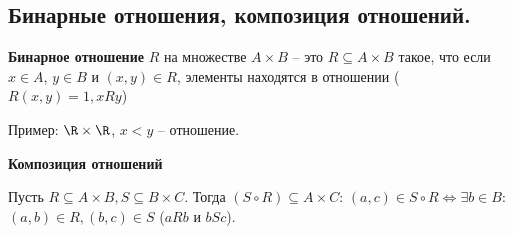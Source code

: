 \subsection{Бинарные отношения, композиция отношений.}

 \textbf{Бинарное отношение} $R$ на множестве $A \times B$ -- это $R \subseteq A \times B$ такое, что если $x \in A$, $y \in B$ и $(x, y) \in R$, элементы находятся в отношении ($R(x, y) = 1, xRy$)

Пример: $\R \times \R$, $x < y$ -- отношение.

\textbf{Композиция отношений}

Пусть $R \subseteq A \times B, S \subseteq B \times C$. Тогда $(S \circ R) \subseteq A \times C$: $(a, c) \in S \circ R \Leftrightarrow \exists b \in B:$ $(a, b) \in R, (b, c) \in S$ ($aRb$ и $bSc$).
